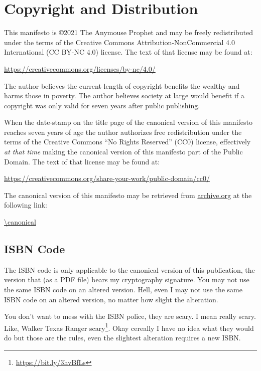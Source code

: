 \section{Copyright and Distribution}

This manifesto is \copyright 2021 The Anymouse Prophet and may be freely redistributed under the terms of the Creative Commons Attribution-NonCommercial 4.0 International (CC BY-NC 4.0) license. The text of that license may be found at:

\bigskip

\url{https://creativecommons.org/licenses/by-nc/4.0/}

\bigskip

\noindent The author believes the current length of copyright benefits the wealthy and harms those in poverty. The author believes society at large would benefit if a copyright was only valid for seven years after public publishing.

When the date-stamp on the title page of the canonical version of this manifesto reaches seven years of age the author authorizes free redistribution under the terms of the Creative Commons ``No Rights Reserved'' (CC0) license, effectively \emph{at that time} making the canonical version of this manifesto part of the Public Domain. The text of that license may be found at:

\bigskip

\url{https://creativecommons.org/share-your-work/public-domain/cc0/}

\bigskip

\noindent The canonical version of this manifesto may be retrieved from \url{archive.org} at the following link:

\bigskip

\url{\canonical}

\subsection{ISBN Code}

The ISBN code is only applicable to the canonical version of this publication, the version that (as a PDF file) bears my cryptography signature. You may not use the same ISBN code on an altered version. Hell, even I may not use the same ISBN code on an altered version, no matter how slight the alteration.

You don't want to mess with the ISBN police, they are scary. I mean really scary. Like, Walker Texas Ranger scary\footnote{\url{https://bit.ly/3hvBfLs}}. Okay cereally I have no idea what they would do but those are the rules, even the slightest alteration requires a new ISBN.

